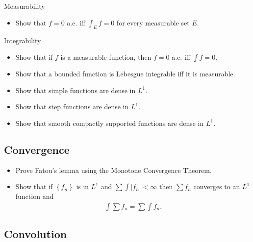 Measurability

\begin{itemize}
\tightlist
\item
  Show that \(f=0\) a.e. iff \(\int_E f = 0\) for every measurable set
  \(E\).
\end{itemize}

Integrability

\begin{itemize}
\tightlist
\item
  Show that if \(f\) is a measurable function, then \(f=0\) a.e. iff
  \(\int f = 0\).
\item
  Show that a bounded function is Lebesgue integrable iff it is
  measurable.
\item
  Show that simple functions are dense in \(L^1\).
\item
  Show that step functions are dense in \(L^1\).
\item
  Show that smooth compactly supported functions are dense in \(L^1\).
\end{itemize}

\hypertarget{convergence}{%
\subsection{Convergence}\label{convergence}}

\begin{itemize}
\tightlist
\item
  Prove Fatou's lemma using the Monotone Convergence Theorem.
\item
  Show that if \(\left\{{f_n}\right\}\) is in \(L^1\) and
  \(\sum \int {\left\lvert {f_n} \right\rvert} < \infty\) then
  \(\sum f_n\) converges to an \(L^1\) function and
  \begin{align*}\int \sum f_n = \sum \int f_n.\end{align*}
\end{itemize}

\hypertarget{convolution}{%
\subsection{Convolution}\label{convolution}}

